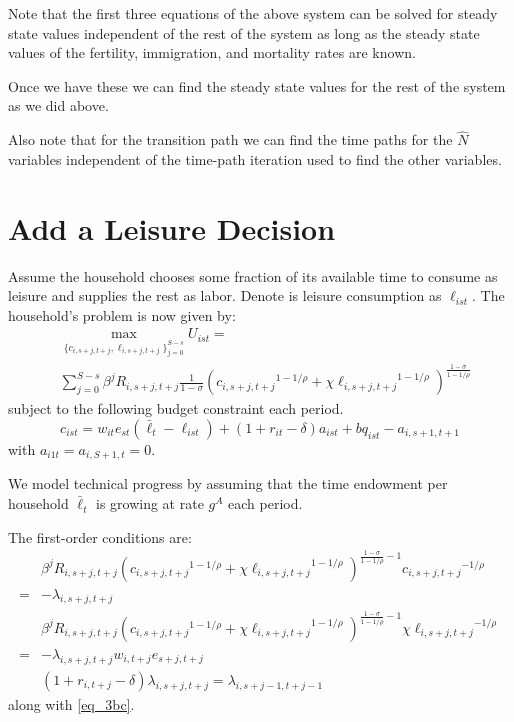 \documentclass[letterpaper,12pt]{article}
\theoremstyle{definition}
\numberwithin{equation}{section}
\begin{document}
\begin{spacing}{1.5}
	Note that the first three equations of the above system can be solved for steady state values independent of the rest of the system as long as the steady state values of the fertility, immigration, and mortality rates are known.

	Once we have these we can find the steady state values for the rest of the system as we did above.

	Also note that for the transition path we can find the time paths for the $\hat N$ variables independent of the time-path iteration used to find the other variables.


\newpage
\section{Add a Leisure Decision}
	Assume the household chooses some fraction of its available time to consume as leisure and supplies the rest as labor.  Denote is leisure consumption as $\ell_{ist}$.  The household's problem is now given by:
	\begin{equation}
		\begin{split}
		& \max_{\{c_{i,s+j,t+j},\ell_{i,s+j,t+j}\}_{j=0}^{S-s}} U_{ist} = \\
		& \sum_{j=0}^{S-s} \beta^j R_{i,s+j,t+j} \frac{1}{1-\sigma} \left( {c_{i,s+j,t+j}}^{1-1/\rho} + \chi {\ell_{i,s+j,t+j}}^{1-1/\rho}\right)^{\tfrac{{1-\sigma}}{1-1/\rho}}  \nonumber
		\end{split}
	\end{equation}
	subject to the following budget constraint each period.
	\begin{equation} \label{eq_3bc}
		c_{ist} = w_{it} e_{st} (\bar \ell_t -\ell_{ist}) + (1+r_{it}-\delta)a_{ist} + bq_{ist} - a_{i,s+1,t+1}
	\end{equation}
	with $a_{i1t} = a_{i,S+1,t} = 0$.

	We model technical progress by assuming that the time endowment per household $\bar \ell_t$ is growing at rate $g^A$ each period.

	The first-order conditions are:
	\begin{align}
		& \beta^j R_{i,s+j,t+j} \left( {c_{i,s+j,t+j}}^{1-1/\rho} + \chi {\ell_{i,s+j,t+j}}^{1-1/\rho}\right)^{\tfrac{{1-\sigma}}{1-1/\rho}-1} {c_{i,s+j,t+j}}^{-1/\rho}  \nonumber \\ = &  - \lambda_{i,s+j,t+j}  \label{eq_3foc1} \\
		& \beta^j R_{i,s+j,t+j} \left( {c_{i,s+j,t+j}}^{1-1/\rho} + \chi {\ell_{i,s+j,t+j}}^{1-1/\rho}\right)^{\tfrac{{1-\sigma}}{1-1/\rho}-1} \chi {\ell_{i,s+j,t+j}}^{-1/\rho} \nonumber \\ = & - \lambda_{i,s+j,t+j} w_{i,t+j} e_{s+j,t+j} \label{eq_3foc2} \\
        & (1+r_{i,t+j}-\delta) \lambda_{i,s+j,t+j} = \lambda_{i,s+j-1,t+j-1} \label{eq_3foc3}
	\end{align}	
	along with \eqref{eq_3bc}.


\end{spacing}
\end{document}
